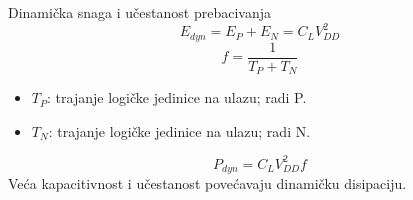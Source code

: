 \begin{frame}[label=09_2-s056]{Dinamička snaga i učestanost prebacivanja}
\[E_{dyn}=E_P+E_N=C_LV_{DD}^2\]
\[f=\frac1{T_P+T_N}\]
\begin{itemize}
\item $T_P$: trajanje logičke jedinice na ulazu; radi P.
\item $T_N$: trajanje logičke jedinice na ulazu; radi N.
\end{itemize}
\[P_{dyn}=C_LV_{DD}^2f\]
Veća kapacitivnost i učestanost povećavaju dinamičku disipaciju.
\end{frame}
